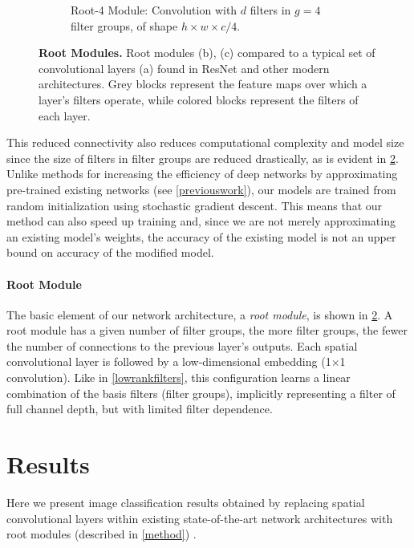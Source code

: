 \documentclass[thesis]{subfiles}
\begin{document}
\begin{figure}[tbp]
\begin{subfigure}[b]{0.95\textwidth}
			\caption{Root-4 Module: Convolution with $d$ filters in $g = 4$ filter groups, of shape $h\times w\times c/4$.}
			\label{fig:rootresnet4}
		\end{subfigure}
		\caption[Root modules: learning a channel basis for filters]{\textbf{Root Modules.} Root modules (b), (c) compared to a typical set of convolutional layers (a) found in ResNet and other modern architectures. Grey blocks represent the feature maps over which a layer's filters operate, while colored blocks represent the filters of each layer. 
		}
		\label{fig:rootmodule}
	\end{figure}
	This reduced connectivity also reduces computational complexity and model size since the size of filters in filter groups are reduced drastically, as is evident in \cref{fig:rootmodule}. Unlike methods for increasing the efficiency of deep networks by approximating pre-trained existing networks (see \cref{previouswork}), our models are trained from random initialization using stochastic gradient descent. This means that our method can also speed up training and, since we are not merely approximating an existing model's weights, the accuracy of the existing model is not an upper bound on accuracy of the modified model.
	
	\paragraph{Root Module}
	The basic element of our network architecture, a \emph{root module}, is shown in \cref{fig:rootmodule}. A root module has a given number of filter groups, the more filter groups, the fewer the number of connections to the previous layer's outputs. Each spatial convolutional layer is followed by a low-dimensional embedding (1$\times$1 convolution). Like in \cref{lowrankfilters}, this configuration  learns a linear combination of the basis filters (filter groups), implicitly representing a filter of full channel depth, but with limited filter dependence.
	
	\section{Results}
	Here we present image classification results obtained by replacing spatial convolutional layers within existing state-of-the-art network architectures with root modules (described in \cref{method}) .
	
\end{document}
